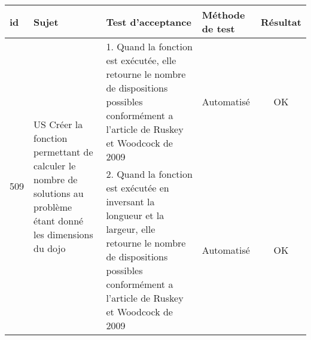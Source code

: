\noindent%
\begin{adjustwidth}{-1.5cm}{0cm}

    \renewcommand{\arraystretch}{1.2}
    {\setlength{\tabcolsep}{1.5 mm}
        \begin{tabular}{|m{0.6cm}|m{5.5cm}|m{8cm}|m{2cm}|c|} \hline
            id                                                                                                       & Sujet                                                                                                                                  & Test d'acceptance                                                                                                                                                                  & Méthode de test & Résultat \\ \hline
            \multirow{2}{0.6cm}{509}                                                                                 & \multirow{2}{5.5cm}{US Créer la fonction permettant de calculer le nombre de solutions au problème étant donné les dimensions du dojo} & 1. Quand la fonction est exécutée, elle retourne le nombre de dispositions possibles conformément a l'article de Ruskey et Woodcock de 2009                                        & Automatisé      & OK       \\ \cline{3-5}
                                                                                                                     &                                                                                                                                        & 2. Quand la fonction est exécutée en inversant la longueur et la largeur, elle retourne le nombre de dispositions possibles conformément a l'article de Ruskey et Woodcock de 2009 & Automatisé      & OK       \\ \hline


\end{tabular}}
\end{adjustwidth}
